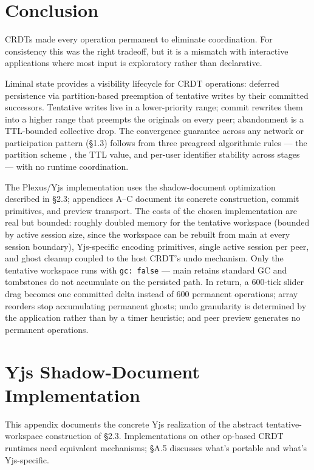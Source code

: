 \section{Conclusion}

CRDTs made every operation permanent to eliminate coordination. For consistency this was the right tradeoff, but it is a mismatch with interactive applications where most input is exploratory rather than declarative.

Liminal state provides a visibility lifecycle for CRDT operations: deferred persistence via partition-based preemption of tentative writes by their committed successors. Tentative writes live in a lower-priority range; commit rewrites them into a higher range that preempts the originals on every peer; abandonment is a TTL-bounded collective drop. The convergence guarantee across any network or participation pattern (\S1.3) follows from three preagreed algorithmic rules --- the partition scheme \cite{plexus:partitioning}, the TTL value, and per-user identifier stability across stages --- with no runtime coordination.

The Plexus/Yjs implementation uses the shadow-document optimization described in \S2.3; appendices A--C document its concrete construction, commit primitives, and preview transport. The costs of the chosen implementation are real but bounded: roughly doubled memory for the tentative workspace (bounded by active session size, since the workspace can be rebuilt from main at every session boundary), Yjs-specific encoding primitives, single active session per peer, and ghost cleanup coupled to the host CRDT's undo mechanism. Only the tentative workspace runs with \texttt{gc: false} --- main retains standard GC and tombstones do not accumulate on the persisted path. In return, a 600-tick slider drag becomes one committed delta instead of 600 permanent operations; array reorders stop accumulating permanent ghosts; undo granularity is determined by the application rather than by a timer heuristic; and peer preview generates no permanent operations.

\appendix

\section{Yjs Shadow-Document Implementation}

This appendix documents the concrete Yjs realization of the abstract tentative-workspace construction of \S2.3. Implementations on other op-based CRDT runtimes need equivalent mechanisms; \S A.5 discusses what's portable and what's Yjs-specific.

